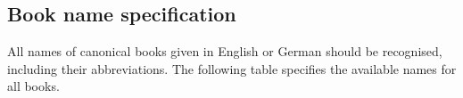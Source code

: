 \documentclass[DIV12,BCOR0mm]{scrartcl}
\newcommand{\ger}[1]{\foreignlanguage{ngerman}{#1}}
\begin{document}
\subsection{Book name specification}\label{sec:books}
All names of canonical books given in English or German should be recognised,
including their abbreviations. The following table specifies the available names
for all books.

\makeatletter
\def\checkbook#1#2#3{%
  \def\brp@range##1##2##3##4##5{\ifstrequal{##1}{#1}{#3 }{%
      \PackageError{bibleref-parse}{Book name `#2' not recognised as `#1'}{}{}%
      \textcolor{red}{#3} }}%
  \brp@parse{#2}%
  \brp@result%
}
\def\checkbooksilent#1#2{%
  \def\brp@range##1##2##3##4##5{\ifstrequal{##1}{#1}{}{%
      \PackageError{bibleref-parse}{Book name `#2' not recognised as `#1'}{}{}%
      \textcolor{red}{#2} }}%
  \brp@parse{#2}%
  \brp@result%
}
\makeatother
\def\addrow#1#2#3#4{%
  #1&\checkbooksilent{#1}{#1}%
  \foreach \name in {#4} {%
    \checkbooksilent{#1}{\name}%
  }%
  \foreach \name/\n in {#2} {%
    \checkbook{#1}{\name}{\n}%
  }&\ger{\foreach \name/\n in {#3} {%
    \checkbook{#1}{\name}{\n}%
  }}\\
}
\end{document}
